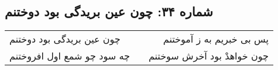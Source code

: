 \begin{center}
\section*{شماره ۳۴: چون عین بریدگی بود دوختنم}
\label{sec:034}
\begin{longtable}{l p{0.5cm} r}
چون عین بریدگی بود دوختنم
&&
پس بی خبریم به ز آموختنم
\\
چه سود چو شمع اول افروختنم
&&
چون خواهدْ بود آخرش سوختنم
\\
\end{longtable}
\end{center}
